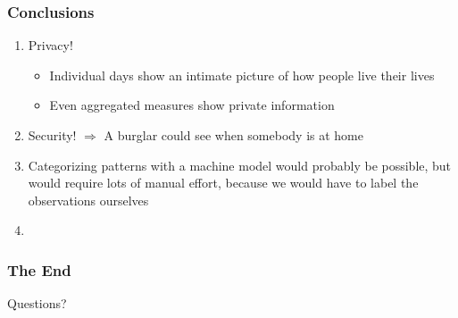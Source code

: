 \documentclass[10pt]{beamer}
\begin{document}
\begin{frame}
\frametitle{Conclusions}

\begin{enumerate}
    \item Privacy!
    \begin{itemize}
        \item Individual days show an intimate picture of how people live their lives
        \item Even aggregated measures show private information
    \end{itemize}
    \item Security! \(\Rightarrow \) A burglar could see when somebody is at home
    \item Categorizing patterns with a machine model would probably be possible, but would require
    lots of manual effort, because we would have to label the observations ourselves
    \item
\end{enumerate}

\end{frame}

\begin{frame}
\frametitle{The End}

\LARGE{\centerline{Questions?}}

\end{frame}

\end{document}
